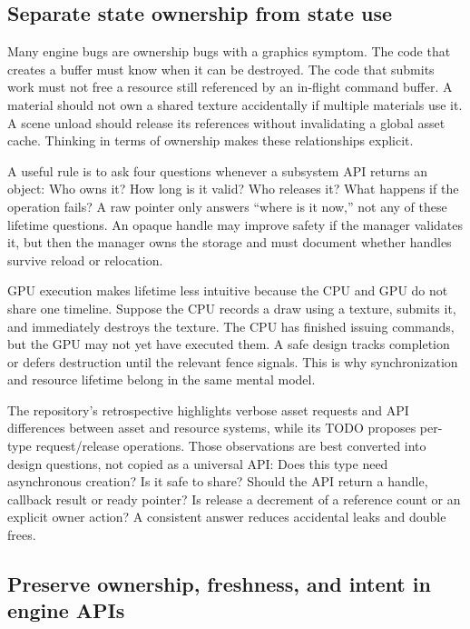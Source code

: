 \subsection{Separate state ownership from state use}\label{05-engine-i-ch014-separate-state-ownership-from-state-use}

\hypertarget{05-engine-i-ch014-separate-state-ownership-from-state-use}{}

Many engine bugs are ownership bugs with a graphics symptom. The code that creates a buffer must know when it can be destroyed. The code that submits work must not free a resource still referenced by an in-flight command buffer. A material should not own a shared texture accidentally if multiple materials use it. A scene unload should release its references without invalidating a global asset cache. Thinking in terms of ownership makes these relationships explicit.

A useful rule is to ask four questions whenever a subsystem API returns an object: Who owns it? How long is it valid? Who releases it? What happens if the operation fails? A raw pointer only answers ``where is it now,'' not any of these lifetime questions. An opaque handle may improve safety if the manager validates it, but then the manager owns the storage and must document whether handles survive reload or relocation.

GPU execution makes lifetime less intuitive because the CPU and GPU do not share one timeline. Suppose the CPU records a draw using a texture, submits it, and immediately destroys the texture. The CPU has finished issuing commands, but the GPU may not yet have executed them. A safe design tracks completion or defers destruction until the relevant fence signals. This is why synchronization and resource lifetime belong in the same mental model.

The repository's retrospective highlights verbose asset requests and API differences between asset and resource systems, while its TODO proposes per-type request/release operations. Those observations are best converted into design questions, not copied as a universal API: Does this type need asynchronous creation? Is it safe to share? Should the API return a handle, callback result or ready pointer? Is release a decrement of a reference count or an explicit owner action? A consistent answer reduces accidental leaks and double frees.

\subsection{Preserve ownership, freshness, and intent in engine APIs}\label{05-engine-i-ch014-preserve-ownership-freshness-and-intent-in-engine-apis}

